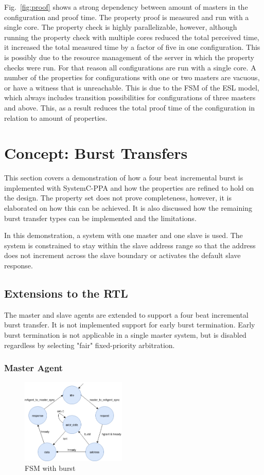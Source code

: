 Fig.~\ref{fig:proof} shows a strong dependency between amount of masters in the configuration and proof time. The property proof is measured and run with a single core. The property check is highly parallelizable, however, although running the property check with multiple cores reduced the total perceived time, it increased the total measured time by a factor of five in one configuration. This is possibly due to the resource management of the server in which the property checks were run. For that reason all configurations are run with a single core. A number of the properties for configurations with one or two masters are vacuous, or have a witness that is unreachable. This is due to the FSM of the ESL model, which always includes transition possibilities for configurations of three masters and above. This, as a result reduces the total proof time of the configuration in relation to amount
of properties.
\section{Concept: Burst Transfers}
\label{sec:burst}
This section covers a demonstration of how a four beat incremental burst is implemented with SystemC-PPA and how the properties are refined to hold on the design.
The property set does not prove completeness, however, it is elaborated on how this can be achieved. It is also discussed how the remaining burst transfer types can be implemented and the limitations. \par
In this demonstration, a system with one master and one slave is used. The system is constrained to stay within the slave address range so that the address does not increment across the slave boundary or activates the default slave response. 

\subsection{Extensions to the RTL}
The master and slave agents are extended to support a four beat incremental burst transfer. It is not implemented support for early burst termination. Early burst termination is not applicable in a single master system, but is disabled regardless by selecting "fair" fixed-priority arbitration.  
 
\subsubsection{Master Agent}
\begin{figure}
\includegraphics[width=5cm]{figs/hw/mAgent_burstfsm.png}
\caption{FSM with burst}\label{fig:magt-burstfsm}
\end{figure} 

